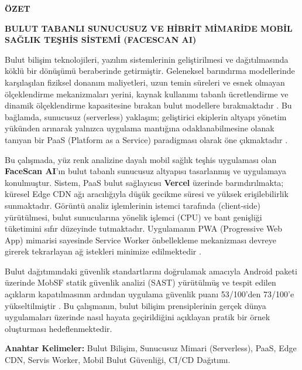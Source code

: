 {}

\begin{center}
\textbf{\large ÖZET}

\textbf{BULUT TABANLI SUNUCUSUZ VE HİBRİT MİMARİDE MOBİL SAĞLIK TEŞHİS SİSTEMİ (FACESCAN AI)}
\end{center}

Bulut bilişim teknolojileri, yazılım sistemlerinin geliştirilmesi ve dağıtılmasında köklü bir dönüşümü beraberinde getirmiştir. Geleneksel barındırma modellerinde karşılaşılan fiziksel donanım maliyetleri, uzun temin süreleri ve esnek olmayan ölçeklendirme mekanizmaları yerini, kaynak kullanımı tabanlı ücretlendirme ve dinamik ölçeklendirme kapasitesine bırakan bulut modellere bırakmaktadır \cite{mell2011nist}. Bu bağlamda, sunucusuz (serverless) yaklaşım; geliştirici ekiplerin altyapı yönetim yükünden arınarak yalnızca uygulama mantığına odaklanabilmesine olanak tanıyan bir PaaS (Platform as a Service) paradigması olarak öne çıkmaktadır \cite{jonas2019cloud}.

Bu çalışmada, yüz renk analizine dayalı mobil sağlık teşhis uygulaması olan \textbf{FaceScan AI}'ın bulut tabanlı sunucusuz altyapısı tasarlanmış ve uygulamaya konulmuştur. Sistem, PaaS bulut sağlayıcısı \textbf{Vercel} üzerinde barındırılmakta; küresel Edge CDN ağı aracılığıyla düşük gecikme süresi ve yüksek erişilebilirlik sunmaktadır. Görüntü analiz işlemlerinin istemci tarafında (client-side) yürütülmesi, bulut sunucularına yönelik işlemci (CPU) ve bant genişliği tüketimini sıfır düzeyinde tutmaktadır. Uygulamanın PWA (Progressive Web App) mimarisi sayesinde Service Worker önbellekleme mekanizması devreye girerek tekrarlayan ağ istekleri minimize edilmektedir \cite{biorn2017progressive}.

Bulut dağıtımındaki güvenlik standartlarını doğrulamak amacıyla Android paketi üzerinde MobSF statik güvenlik analizi (SAST) yürütülmüş ve tespit edilen açıkların kapatılmasının ardından uygulama güvenlik puanı 53/100'den 73/100'e yükseltilmiştir \cite{mobsf2023docs}. Bu çalışmanın, bulut bilişim prensiplerinin gerçek dünya uygulamaları üzerinde nasıl hayata geçirildiğini açıklayan pratik bir örnek oluşturması hedeflenmektedir.

\vspace{1.5cm}
\textbf{Anahtar Kelimeler:} Bulut Bilişim, Sunucusuz Mimari (Serverless), PaaS, Edge CDN, Servis Worker, Mobil Bulut Güvenliği, CI/CD Dağıtımı.

\pagebreak{}
